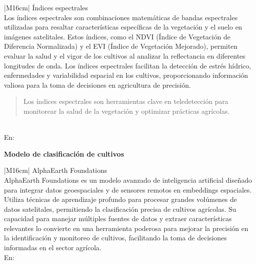 \begin{table}[h!]
  \centering
  \renewcommand{\arraystretch}{2} %
  \begin{tabular}{|M{16cm}|}
    \hline
    Índices espectrales \\
    \hline
    Los índices espectrales son combinaciones matemáticas de bandas espectrales utilizadas para resaltar características específicas de la vegetación y el suelo en imágenes satelitales. Estos índices, como el NDVI (Índice de Vegetación de Diferencia Normalizada) y el EVI (Índice de Vegetación Mejorado), permiten evaluar la salud y el vigor de los cultivos al analizar la reflectancia en diferentes longitudes de onda. Los índices espectrales facilitan la detección de estrés hídrico, enfermedades y variabilidad espacial en los cultivos, proporcionando información valiosa para la toma de decisiones en agricultura de precisión.
    \begin{quote}
      Los índices espectrales son herramientas clave en teledetección para monitorear la salud de la vegetación y optimizar prácticas agrícolas.
    \end{quote}
    \\
    \hline
    En: \cite{Ram2024} \\
    \hline
  \end{tabular}
  \label{tab:argumento3c}
\end{table}

\newpage

{\large\textbf{Modelo de clasificación de cultivos}}

\begin{table}[h!]
  \centering
  \renewcommand{\arraystretch}{2} %
  \begin{tabular}{|M{16cm}|}
    \hline
    AlphaEarth Foundations \\
    \hline
    AlphaEarth Foundations es un modelo avanzado de inteligencia artificial diseñado para integrar datos geoespaciales y de sensores remotos en embeddings espaciales. Utiliza técnicas de aprendizaje profundo para procesar grandes volúmenes de datos satelitales, permitiendo la clasificación precisa de cultivos agrícolas. Su capacidad para manejar múltiples fuentes de datos y extraer características relevantes lo convierte en una herramienta poderosa para mejorar la precisión en la identificación y monitoreo de cultivos, facilitando la toma de decisiones informadas en el sector agrícola.
    \\
    \hline
    En: \cite{Brown2025} \\
    \hline
  \end{tabular}
  \label{tab:argumento4}
\end{table}

